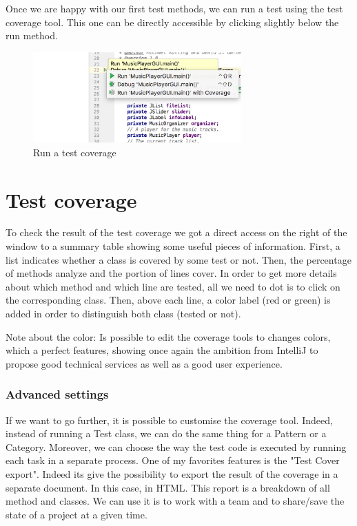 Once we are happy with our first test methods, we can run a test using the test coverage tool. This one can be directly accessible by clicking slightly below the run method.


\begin{figure}[H]
  \centering
  \includegraphics[width=8cm]{body/s1.png}
  \caption{Run a test coverage}
\end{figure}

\section{Test coverage}

To check the result of the test coverage we got a direct access on the right of the window to a summary table showing some useful pieces of information. First, a list indicates whether a class is covered by some test or not. Then, the percentage of methods analyze and the portion of lines cover. In order to get more details about which method and which line are tested, all we need to dot is to click on the corresponding class. Then, above each line, a color label (red or green) is added in order to distinguish both class (tested or not).

Note about the color: Is possible to edit the coverage tools to changes colors, which a perfect features, showing once again the ambition from IntelliJ to propose good technical services as well as a good user experience.

\subsubsection{Advanced settings}

If we want to go further, it is possible to customise the coverage tool. Indeed, instead of running a Test class, we can do the same thing for a Pattern or a Category. Moreover, we can choose the way the test code is executed by running each task in a separate process. One of my favorites features is the "Test Cover export".  Indeed its give the possibility to export the result of the coverage in a separate document. In this case, in HTML. This report is a breakdown of all method and classes. We can use it is to work with a team and to share/save the state of a project at a given time.

